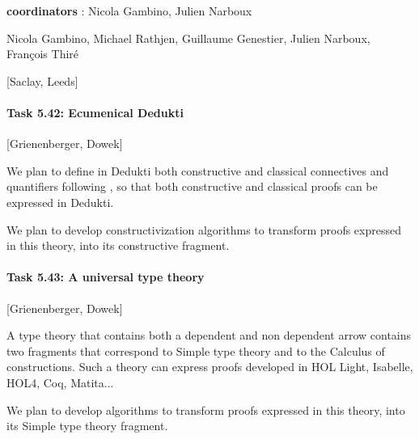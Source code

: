{\bf coordinators} : Nicola Gambino, Julien Narboux 

Nicola Gambino, Michael Rathjen, Guillaume Genestier, Julien Narboux,
François Thiré

[Saclay, Leeds]

\paragraph{Task 5.42: Ecumenical Dedukti}

[Grienenberger, Dowek]

We plan to define in {\sc Dedukti} both constructive and classical
connectives and quantifiers
following \cite{PrawitzPereira,DowekPereira,Pereira}, so that both
constructive and classical proofs can be expressed in {\sc Dedukti}.

We plan to develop constructivization algorithms to transform proofs
expressed in this theory, into its constructive fragment.

\paragraph{Task 5.43: A universal type theory}

[Grienenberger, Dowek]

A type theory that contains both a dependent and non dependent arrow
contains two fragments that correspond to Simple type theory and to
the Calculus of constructions. Such a theory can express proofs
developed in HOL Light, Isabelle, HOL4, Coq, Matita...

We plan to develop algorithms to transform proofs expressed in this
theory, into its Simple type theory fragment.
